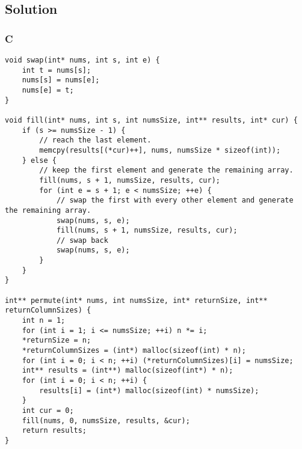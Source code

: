 \subsection*{Solution}
\subsubsection*{C}
\begin{verbatim}
void swap(int* nums, int s, int e) {
    int t = nums[s];
    nums[s] = nums[e];
    nums[e] = t;
}

void fill(int* nums, int s, int numsSize, int** results, int* cur) {
    if (s >= numsSize - 1) {
        // reach the last element.
        memcpy(results[(*cur)++], nums, numsSize * sizeof(int));
    } else {
        // keep the first element and generate the remaining array.
        fill(nums, s + 1, numsSize, results, cur);
        for (int e = s + 1; e < numsSize; ++e) {
            // swap the first with every other element and generate the remaining array.
            swap(nums, s, e);
            fill(nums, s + 1, numsSize, results, cur);
            // swap back
            swap(nums, s, e);
        }
    }
}

int** permute(int* nums, int numsSize, int* returnSize, int** returnColumnSizes) {
    int n = 1;
    for (int i = 1; i <= numsSize; ++i) n *= i;
    *returnSize = n;
    *returnColumnSizes = (int*) malloc(sizeof(int) * n);
    for (int i = 0; i < n; ++i) (*returnColumnSizes)[i] = numsSize;
    int** results = (int**) malloc(sizeof(int*) * n);
    for (int i = 0; i < n; ++i) {
        results[i] = (int*) malloc(sizeof(int) * numsSize);
    }
    int cur = 0;
    fill(nums, 0, numsSize, results, &cur);
    return results;
}

\end{verbatim}

\newpage

